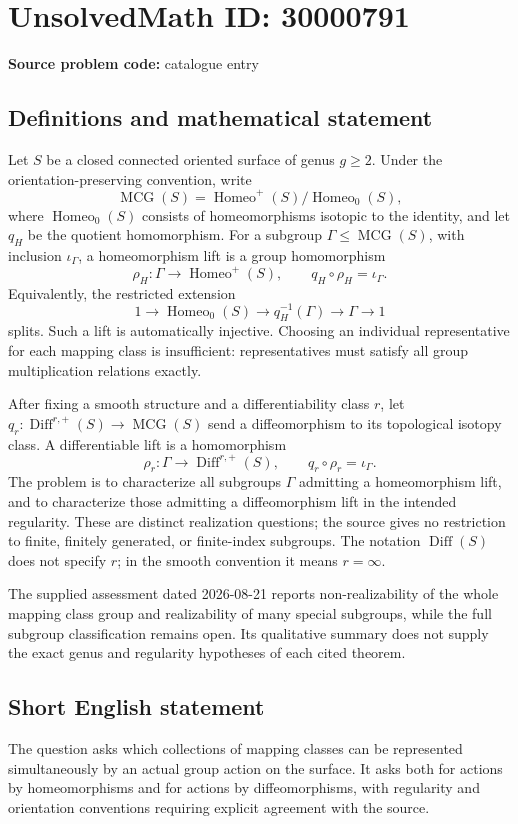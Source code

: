 \documentclass[11pt]{article}
\begin{document}
\section*{UnsolvedMath ID: 30000791}
\textbf{Source problem code:} catalogue entry
\subsection{Definitions and mathematical statement}
Let \(S\) be a closed connected oriented surface of genus \(g\geq2\). Under the orientation-preserving convention, write
\[
 \operatorname{MCG}(S)=\operatorname{Homeo}^+(S)/\operatorname{Homeo}_0(S),
\]
where \(\operatorname{Homeo}_0(S)\) consists of homeomorphisms isotopic to the identity, and let \(q_H\) be the quotient homomorphism. For a subgroup \(\Gamma\leq\operatorname{MCG}(S)\), with inclusion \(\iota_\Gamma\), a homeomorphism lift is a group homomorphism
\[
 \rho_H:\Gamma\longrightarrow\operatorname{Homeo}^+(S),\qquad
 q_H\circ\rho_H=\iota_\Gamma.
\]
Equivalently, the restricted extension
\[
 1\longrightarrow\operatorname{Homeo}_0(S)
 \longrightarrow q_H^{-1}(\Gamma)
 \longrightarrow\Gamma\longrightarrow1
\]
splits. Such a lift is automatically injective. Choosing an individual representative for each mapping class is insufficient: representatives must satisfy all group multiplication relations exactly.

After fixing a smooth structure and a differentiability class \(r\), let
\(q_r:\operatorname{Diff}^{r,+}(S)\to\operatorname{MCG}(S)\) send a diffeomorphism to its topological isotopy class. A differentiable lift is a homomorphism
\[
 \rho_r:\Gamma\longrightarrow\operatorname{Diff}^{r,+}(S),\qquad
 q_r\circ\rho_r=\iota_\Gamma.
\]
The problem is to characterize all subgroups \(\Gamma\) admitting a homeomorphism lift, and to characterize those admitting a diffeomorphism lift in the intended regularity. These are distinct realization questions; the source gives no restriction to finite, finitely generated, or finite-index subgroups. The notation \(\operatorname{Diff}(S)\) does not specify \(r\); in the smooth convention it means \(r=\infty\).

The supplied assessment dated 2026-08-21 reports non-realizability of the whole mapping class group and realizability of many special subgroups, while the full subgroup classification remains open. Its qualitative summary does not supply the exact genus and regularity hypotheses of each cited theorem.
\subsection{Short English statement}
The question asks which collections of mapping classes can be represented simultaneously by an actual group action on the surface. It asks both for actions by homeomorphisms and for actions by diffeomorphisms, with regularity and orientation conventions requiring explicit agreement with the source.
\end{document}
